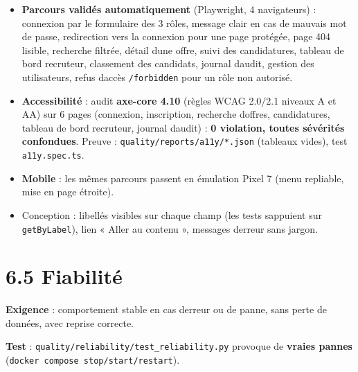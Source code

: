 \documentclass[
  11pt,
]{article}
\providecommand{\tightlist}{%
  \setlength{\itemsep}{0pt}\setlength{\parskip}{0pt}}
\begin{document}
\begin{itemize}
\tightlist
\item
  \textbf{Parcours validés automatiquement} (Playwright, 4 navigateurs)
  : connexion par le formulaire des 3 rôles, message clair en cas de
  mauvais mot de passe, redirection vers la connexion pour une page
  protégée, page 404 lisible, recherche filtrée, détail
  d\textquotesingle une offre, suivi des candidatures, tableau de bord
  recruteur, classement des candidats, journal d\textquotesingle audit,
  gestion des utilisateurs, refus d\textquotesingle accès
  \texttt{/forbidden} pour un rôle non autorisé.
\item
  \textbf{Accessibilité} : audit \textbf{axe-core 4.10} (règles WCAG
  2.0/2.1 niveaux A et AA) sur 6 pages (connexion, inscription,
  recherche d\textquotesingle offres, candidatures, tableau de bord
  recruteur, journal d\textquotesingle audit) : \textbf{0 violation,
  toutes sévérités confondues}. Preuve :
  \texttt{quality/}\allowbreak{}\texttt{reports/}\allowbreak{}\texttt{a11y/}\allowbreak{}\texttt{*.}\allowbreak{}\texttt{json}
  (tableaux vides), test \texttt{a11y.spec.ts}.
\item
  \textbf{Mobile} : les mêmes parcours passent en émulation Pixel 7
  (menu repliable, mise en page étroite).
\item
  Conception : libellés visibles sur chaque champ (les tests
  s\textquotesingle appuient sur \texttt{getByLabel}), lien « Aller au
  contenu », messages d\textquotesingle erreur sans jargon.
\end{itemize}

\section{6.5 Fiabilité}\label{65-fiabilituxe9}

\textbf{Exigence} : comportement stable en cas d\textquotesingle erreur
ou de panne, sans perte de données, avec reprise correcte.

\textbf{Test} :
\texttt{quality/}\allowbreak{}\texttt{reliability/}\allowbreak{}\texttt{test\_}\allowbreak{}\texttt{reliability.}\allowbreak{}\texttt{py}
provoque de \textbf{vraies pannes}
(\texttt{docker\ compose\ stop/}\allowbreak{}\texttt{start/}\allowbreak{}\texttt{restart}).
\end{document}
